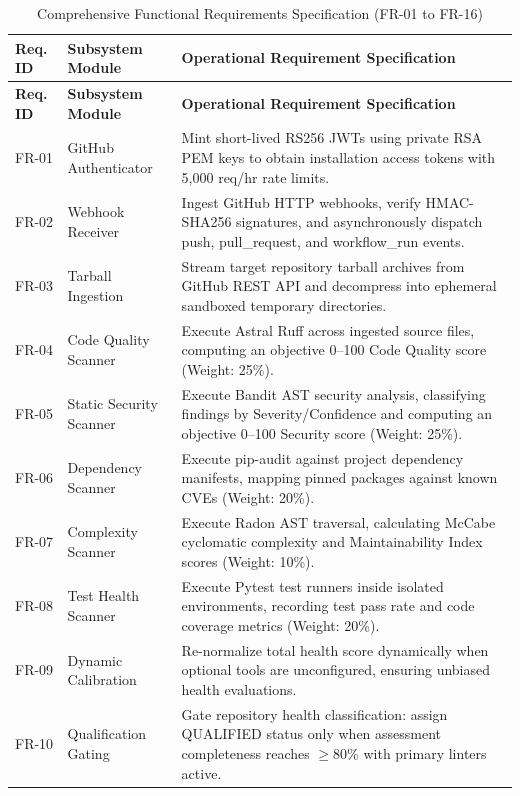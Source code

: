 \begin{longtable}{p{} p{} p{}}
\caption{Comprehensive Functional Requirements Specification (FR-01 to FR-16)} \label{tab:functional-requirements} \\
\toprule
\textbf{Req. ID} & \textbf{Subsystem Module} & \textbf{Operational Requirement Specification} \\
\midrule
\endfirsthead
\toprule
\textbf{Req. ID} & \textbf{Subsystem Module} & \textbf{Operational Requirement Specification} \\
\midrule
\endhead
\bottomrule
\endfoot
\bottomrule
\endlastfoot

FR-01 & GitHub Authenticator & Mint short-lived RS256 JWTs using private RSA PEM keys to obtain installation access tokens with 5,000 req/hr rate limits. \\
\addlinespace
FR-02 & Webhook Receiver & Ingest GitHub HTTP webhooks, verify HMAC-SHA256 signatures, and asynchronously dispatch push, pull\_request, and workflow\_run events. \\
\addlinespace
FR-03 & Tarball Ingestion & Stream target repository tarball archives from GitHub REST API and decompress into ephemeral sandboxed temporary directories. \\
\addlinespace
FR-04 & Code Quality Scanner & Execute Astral Ruff across ingested source files, computing an objective 0--100 Code Quality score (Weight: 25\%). \\
\addlinespace
FR-05 & Static Security Scanner & Execute Bandit AST security analysis, classifying findings by Severity/Confidence and computing an objective 0--100 Security score (Weight: 25\%). \\
\addlinespace
FR-06 & Dependency Scanner & Execute pip-audit against project dependency manifests, mapping pinned packages against known CVEs (Weight: 20\%). \\
\addlinespace
FR-07 & Complexity Scanner & Execute Radon AST traversal, calculating McCabe cyclomatic complexity and Maintainability Index scores (Weight: 10\%). \\
\addlinespace
FR-08 & Test Health Scanner & Execute Pytest test runners inside isolated environments, recording test pass rate and code coverage metrics (Weight: 20\%). \\
\addlinespace
FR-09 & Dynamic Calibration & Re-normalize total health score dynamically when optional tools are unconfigured, ensuring unbiased health evaluations. \\
\addlinespace
FR-10 & Qualification Gating & Gate repository health classification: assign QUALIFIED status only when assessment completeness reaches $\ge 80\%$ with primary linters active. \\

\end{longtable}
